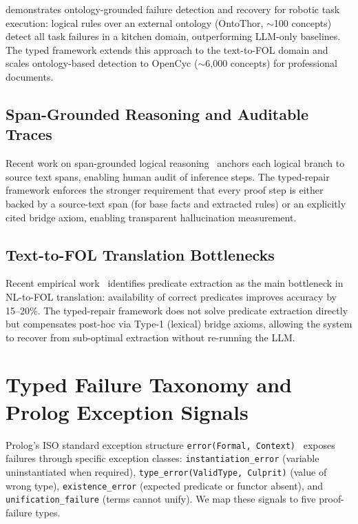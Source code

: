 \documentclass[11pt,letterpaper]{article}
\begin{document}
\citet{Cornelio2024} demonstrates ontology-grounded failure detection and recovery for
robotic task execution: logical rules over an external ontology (OntoThor,
$\sim$100 concepts) detect all task failures in a kitchen domain, outperforming
LLM-only baselines. The typed framework extends this approach to the text-to-FOL
domain and scales ontology-based detection to OpenCyc ($\sim$6,000 concepts) for
professional documents.

\subsection{Span-Grounded Reasoning and Auditable Traces}

Recent work on span-grounded logical reasoning~\citep{Kalouli2022} anchors each
logical branch to source text spans, enabling human audit of inference steps. The
typed-repair framework enforces the stronger requirement that every proof step is
either backed by a source-text span (for base facts and extracted rules) or an
explicitly cited bridge axiom, enabling transparent hallucination measurement.

\subsection{Text-to-FOL Translation Bottlenecks}

Recent empirical work~\citep{Ranaldi2023} identifies predicate extraction as the main
bottleneck in NL-to-FOL translation: availability of correct predicates improves
accuracy by 15--20\%. The typed-repair framework does not solve predicate extraction
directly but compensates post-hoc via Type-1 (lexical) bridge axioms, allowing the
system to recover from sub-optimal extraction without re-running the LLM.

\section{Typed Failure Taxonomy and Prolog Exception Signals}
\label{sec:taxonomy}

Prolog's ISO standard exception structure \texttt{error(Formal, Context)}~\citep{ISO2012}
exposes failures through specific exception classes: \texttt{instantiation\_error}
(variable uninstantiated when required), \texttt{type\_error(ValidType, Culprit)}
(value of wrong type), \texttt{existence\_error} (expected predicate or functor
absent), and \texttt{unification\_failure} (terms cannot unify). We map these
signals to five proof-failure types.
\end{document}
